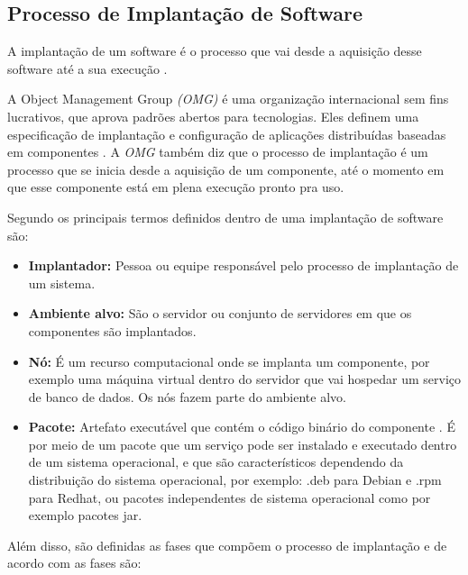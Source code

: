 \subsection{Processo de Implantação de Software}
\label{sub:processoimplantacao}

A implantação de um software é o processo que vai desde a aquisição desse software
até a sua execução \cite{leo2014}.

A Object Management Group \textit{(OMG)} é uma organização internacional sem fins lucrativos,
que aprova padrões abertos para tecnologias. Eles definem uma especificação de
implantação e configuração de aplicações distribuídas baseadas em componentes \cite{omg2006}. 
A \textit{OMG} também diz que o processo de implantação é um processo que se inicia desde
a aquisição de um componente, até o momento em que esse componente está em plena
execução pronto pra uso.

Segundo  os principais termos definidos dentro de uma implantação
de software são:

\begin{itemize}
  \item  \textbf{Implantador:} Pessoa ou equipe responsável pelo processo de
  implantação  de um sistema.
  \item  \textbf{Ambiente alvo:} São o servidor ou conjunto de servidores em
  que os componentes são implantados.
  \item  \textbf{Nó:} É um recurso computacional onde se implanta um componente,
  por exemplo uma máquina virtual dentro do servidor que vai hospedar um serviço
  de banco de dados. Os nós fazem parte do ambiente alvo.
  \item  \textbf{Pacote:} Artefato executável que contém o código binário do componente
  . É por meio de um pacote que um serviço pode ser instalado e executado dentro
  de um sistema operacional, e que são característicos dependendo da distribuição
  do sistema operacional, por exemplo: .deb para Debian e .rpm para Redhat, ou
  pacotes independentes de sistema operacional como por exemplo pacotes jar.
\end{itemize}

Além disso, são definidas as fases que compõem o processo de implantação e de acordo
com  as fases são:

